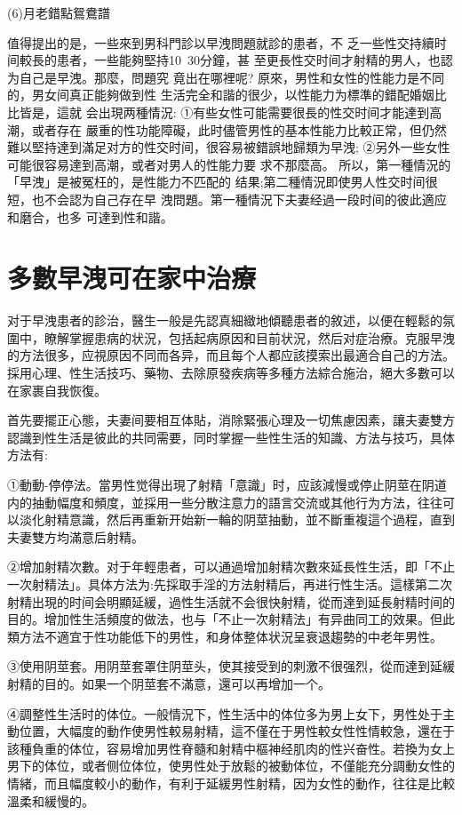 \documentclass[12pt,UTF8]{ctexbook}
\begin{document}
(6)月老錯點鴛鴦譜

值得提出的是，一些來到男科門診以早洩問題就診的患者，不
乏一些性交持續时间較長的患者，一些能夠堅持10~30分鐘，甚
至更長性交时间才射精的男人，也認为自己是早洩。那麼，問題究
竟出在哪裡呢?
原來，男性和女性的性能力是不同的，男女间真正能夠做到性
生活完全和諧的很少，以性能力为標準的錯配婚姻比比皆是，這就
会出現两種情況:
①有些女性可能需要很長的性交时间才能達到高潮，或者存在
嚴重的性功能障礙，此时儘管男性的基本性能力比較正常，但仍然
難以堅持達到滿足对方的性交时间，很容易被錯誤地歸類为早洩;
②另外一些女性可能很容易達到高潮，或者对男人的性能力要
求不那麼高。
所以，第一種情況的「早洩」是被冤枉的，是性能力不匹配的
结果;第二種情況即使男人性交时间很短，也不会認为自己存在早
洩問題。第一種情況下夫妻经過一段时间的彼此適应和磨合，也多
可達到性和諧。

\section{多數早洩可在家中治療}

对于早洩患者的診治，醫生一般是先認真細緻地傾聽患者的敘述，以便在輕鬆的氛圍中，瞭解掌握患病的状況，包括起病原因和目前状況，然后对症治療。克服早洩的方法很多，应視原因不同而各异，而且每个人都应該摸索出最適合自己的方法。採用心理、性生活技巧、藥物、去除原發疾病等多種方法綜合施治，絕大多數可以在家裹自我恢復。

首先要擺正心態，夫妻间要相互体貼，消除緊張心理及一切焦慮因素，讓夫妻雙方認識到性生活是彼此的共同需要，同时掌握一些性生活的知識、方法与技巧，具体方法有:

①動動-停停法。當男性觉得出現了射精「意識」时，应該減慢或停止阴莖在阴道内的抽動幅度和頻度，並採用一些分散注意力的語言交流或其他行为方法，往往可以淡化射精意識，然后再重新开始新一輪的阴莖抽動，並不斷重複這个過程，直到夫妻雙方均滿意后射精。

②增加射精次數。对于年輕患者，可以通過增加射精次數來延長性生活，即「不止一次射精法」。具体方法为:先採取手淫的方法射精后，再进行性生活。這樣第二次射精出現的时间会明顯延緩，過性生活就不会很快射精，從而達到延長射精时间的目的。增加性生活頻度的做法，也与「不止一次射精法」有异曲同工的效果。但此類方法不適宜于性功能低下的男性，和身体整体状況呈衰退趨勢的中老年男性。

③使用阴莖套。用阴莖套罩住阴莖头，使其接受到的刺激不很强烈，從而達到延緩射精的目的。如果一个阴莖套不滿意，還可以再增加一个。

④調整性生活时的体位。一般情況下，性生活中的体位多为男上女下，男性处于主動位置，大幅度的動作使男性較易射精，這不僅在于男性較女性性情較急，還在于該種負重的体位，容易增加男性脊髓和射精中樞神经肌肉的性兴奋性。若換为女上男下的体位，或者侧位体位，使男性处于放鬆的被動体位，不僅能充分調動女性的情緒，而且幅度較小的動作，有利于延緩男性射精，因为女性的動作，往往是比較溫柔和緩慢的。
\end{document}

